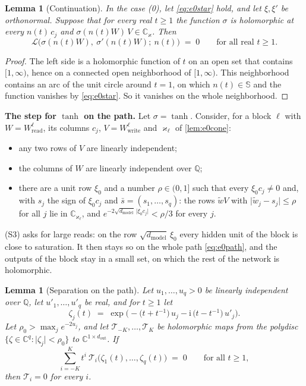 \documentclass[10pt]{article}
\newtheorem{lemma}[theorem]{Lemma}
\theoremstyle{definition}
\theoremstyle{remark}
\newcommand{\Wread}{W_{\mathrm{read}}}
\newcommand{\Wwrite}{W_{\mathrm{write}}}
\newcommand{\dm}{d_{\mathrm{model}}}
\newcommand{\para}[1]{\smallskip\noindent\textbf{#1}\hspace{0.5em}}
\begin{document}
\begin{lemma}[Continuation]\label{lem:e0cont}
In the case (0), let \eqref{eq:e0star} hold, and let $\xi, \xi'$ be orthonormal. Suppose that for every real $t \ge 1$ the function $\sigma$ is holomorphic at every $n(t)\,c_j$ and $\sigma(n(t)W)\,V \in \mathbb C_\varkappa$. Then
\[
\mathcal L\big(\sigma(n(t)W),\ \sigma'(n(t)W);\ n(t)\big) \;=\; 0 \qquad\text{for all real } t \ge 1 .
\]
\end{lemma}

\begin{proof}
The left side is a holomorphic function of $t$ on an open set that contains $[1, \infty)$, hence on a connected open neighborhood of $[1, \infty)$. This neighborhood contains an arc of the unit circle around $t = 1$, on which $n(t) \in \mathbb S$ and the function vanishes by \eqref{eq:e0star}. So it vanishes on the whole neighborhood.
\end{proof}

\para{The step for $\tanh$ on the path.} Let $\sigma = \tanh$. Consider, for a block $\ell$ with $W = \Wread^{\ell}$, its columns $c_j$, $V = \Wwrite^{\ell}$ and $\varkappa_\ell$ of \cref{lem:e0cone}:
\begin{itemize}[leftmargin=2.9em]
\item[(S1)] any two rows of $V$ are linearly independent;
\item[(S2)] the columns of $W$ are linearly independent over $\mathbb Q$;
\item[(S3)] there are a unit row $\xi_0$ and a number $\rho \in (0, 1]$ such that every $\xi_0c_j \neq 0$ and, with $s_j$ the sign of $\xi_0c_j$ and $\bar s = (s_1, \dots, s_q)$: the rows $\tilde wV$ with $\lvert\tilde w_j - s_j\rvert \le \rho$ for all $j$ lie in $\mathbb C_{\varkappa_\ell}$, and $e^{-2\sqrt{\dm}\,\lvert\xi_0c_j\rvert} < \rho/3$ for every $j$.
\end{itemize}
(S3) asks for large reads: on the row $\sqrt{\dm}\,\xi_0$ every hidden unit of the block is close to saturation. It then stays so on the whole path \eqref{eq:e0path}, and the outputs of the block stay in a small set, on which the rest of the network is holomorphic.

\begin{lemma}[Separation on the path]\label{lem:e0sep}
Let $u_1, \dots, u_q > 0$ be linearly independent over $\mathbb Q$, let $u'_1, \dots, u'_q$ be real, and for $t \ge 1$ let
\[
\zeta_j(t) \;=\; \exp\Big(-\big(t + t^{-1}\big)\,u_j - \mathrm i\,\big(t - t^{-1}\big)\,u'_j\Big).
\]
Let $\rho_0 > \max_j e^{-2u_j}$, and let $\mathcal T_{-K}, \dots, \mathcal T_K$ be holomorphic maps from the polydisc $\{\zeta \in \mathbb C^q : \lvert\zeta_j\rvert < \rho_0\}$ to $\mathbb C^{1\times d_{\mathrm{out}}}$. If
\[
\sum_{i=-K}^{K} t^i\ \mathcal T_i\big(\zeta_1(t), \dots, \zeta_q(t)\big) \;=\; 0 \qquad\text{for all } t \ge 1,
\]
then $\mathcal T_i = 0$ for every $i$.
\end{lemma}
\end{document}
